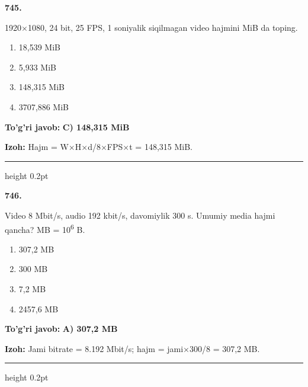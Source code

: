 \documentclass[10pt,a4paper,oneside]{article}
\begin{document}
\noindent\textbf{\color{ink}745.}
\par
1920\ensuremath{\times}1080, 24 bit, 25 FPS, 1 soniyalik siqilmagan video hajmini MiB da toping.
\begin{enumerate}[label=\Alph*),leftmargin=9mm]
\item 18,539 MiB
\item 5,933 MiB
\item 148,315 MiB
\item 3707,886 MiB
\end{enumerate}
\begin{tcolorbox}[enhanced,breakable,colback=teal!4,colframe=teal!50!black,boxrule=0.5pt,arc=1.1mm,left=3mm,right=3mm,top=1.7mm,bottom=1.7mm,before skip=2mm,after skip=2mm]
\textbf{\color{teal}To'g'ri javob:} \textbf{C) 148,315 MiB}
\par\smallskip
\textbf{Izoh:} Hajm = W\ensuremath{\times}H\ensuremath{\times}d/8\ensuremath{\times}FPS\ensuremath{\times}t = 148,315 MiB.
\end{tcolorbox}
\vspace{2mm}\hrule height 0.2pt \vspace{3mm}

\noindent\textbf{\color{ink}746.}
\par
Video 8 Mbit/s, audio 192 kbit/s, davomiylik 300 s. Umumiy media hajmi qancha? MB = 10\textsuperscript{6} B.
\begin{enumerate}[label=\Alph*),leftmargin=9mm]
\item 307,2 MB
\item 300 MB
\item 7,2 MB
\item 2457,6 MB
\end{enumerate}
\begin{tcolorbox}[enhanced,breakable,colback=teal!4,colframe=teal!50!black,boxrule=0.5pt,arc=1.1mm,left=3mm,right=3mm,top=1.7mm,bottom=1.7mm,before skip=2mm,after skip=2mm]
\textbf{\color{teal}To'g'ri javob:} \textbf{A) 307,2 MB}
\par\smallskip
\textbf{Izoh:} Jami bitrate = 8.192 Mbit/s; hajm = jami\ensuremath{\times}300/8 = 307,2 MB.
\end{tcolorbox}
\vspace{2mm}\hrule height 0.2pt \vspace{3mm}
\end{document}
